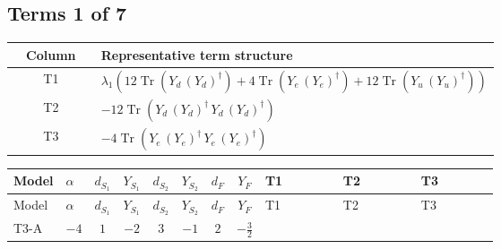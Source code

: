 \documentclass[8pt]{article}
\begin{document}
\begin{landscape}
\subsection*{Terms 1 of 7}
\begin{center}
\begin{tabular}{@{}c >{\raggedright\arraybackslash}p{0.82\linewidth}@{}}
\toprule
Column & Representative term structure \\
\midrule
T1 & \(\displaystyle {\lambda_1} (12 \operatorname{Tr}\!\left({Y_d}\,\left({Y_d}\right)^{\dagger}\right)+4 \operatorname{Tr}\!\left({Y_e}\,\left({Y_e}\right)^{\dagger}\right)+12 \operatorname{Tr}\!\left({Y_u}\,\left({Y_u}\right)^{\dagger}\right))\) \\
\midrule
T2 & \(\displaystyle -12 \operatorname{Tr}\!\left({Y_d}\,\left({Y_d}\right)^{\dagger}\,{Y_d}\,\left({Y_d}\right)^{\dagger}\right)\) \\
\midrule
T3 & \(\displaystyle -4 \operatorname{Tr}\!\left({Y_e}\,\left({Y_e}\right)^{\dagger}\,{Y_e}\,\left({Y_e}\right)^{\dagger}\right)\) \\
\midrule
\bottomrule
\end{tabular}
\end{center}
\smallskip
\tiny
\begin{longtable}{@{}llcccccc >{\raggedright\arraybackslash}p{0.21\linewidth} >{\raggedright\arraybackslash}p{0.21\linewidth} >{\raggedright\arraybackslash}p{0.21\linewidth}@{}}
\toprule
Model & $\alpha$ & $d_{S_1}$ & $Y_{S_1}$ & $d_{S_2}$ & $Y_{S_2}$ & $d_F$ & $Y_F$ & T1 & T2 & T3 \\
\midrule
\endfirsthead
\toprule
Model & $\alpha$ & $d_{S_1}$ & $Y_{S_1}$ & $d_{S_2}$ & $Y_{S_2}$ & $d_F$ & $Y_F$ & T1 & T2 & T3 \\
\midrule
\endhead
T3-A & $-4$ & $1$ & $-2$ & $3$ & $-1$ & $2$ & $-\frac{3}{2}$ & \scriptsize\adjustbox{max width=\linewidth}{$\begin{gathered} {\lambda_1} (12 \operatorname{Tr}\!\left({Y_d}\,\left({Y_d}\right)^{\dagger}\right)+4 \operatorname{Tr}\!\left({Y_e}\,\left({Y_e}\right)^{\dagger}\right)+12 \operatorname{Tr}\!\left({Y_u}\,\left({Y_u}\right)^{\dagger}\right))\end{gathered}$} & \scriptsize\adjustbox{max width=\linewidth}{$\begin{gathered} -12 \operatorname{Tr}\!\left({Y_d}\,\left({Y_d}\right)^{\dagger}\,{Y_d}\,\left({Y_d}\right)^{\dagger}\right)\end{gathered}$} & \scriptsize\adjustbox{max width=\linewidth}{$\begin{gathered} -4 \operatorname{Tr}\!\left({Y_e}\,\left({Y_e}\right)^{\dagger}\,{Y_e}\,\left({Y_e}\right)^{\dagger}\right)\end{gathered}$} \\

\end{longtable}
\end{landscape}
\end{document}
